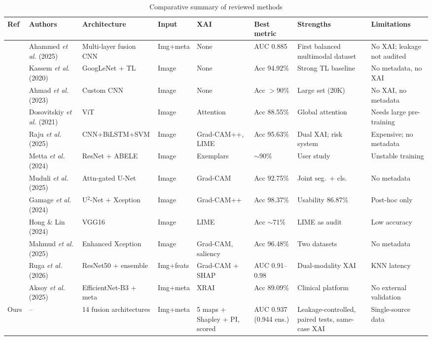 \documentclass[journal]{IEEEtran}
\begin{document}
\begin{table}[!t]
\centering
\caption{Comparative summary of reviewed methods}
\label{tab:lit}
\scriptsize
\begin{tabular}{p{0.4cm}p{1.9cm}p{2.2cm}p{1.1cm}p{1.5cm}p{1.4cm}p{3.1cm}p{2.9cm}}
\toprule
Ref & Authors & Architecture & Input & XAI & Best metric & Strengths & Limitations \\
\midrule
\cite{ahammed2025} & Ahammed \textit{et al.} (2025) & Multi-layer fusion CNN & Img+meta & None & AUC 0.885 & First balanced multimodal dataset & No XAI; leakage not audited \\
\cite{kassem2020} & Kassem \textit{et al.} (2020) & GoogLeNet + TL & Image & None & Acc 94.92\% & Strong TL baseline & No metadata, no XAI \\
\cite{ahmad2023} & Ahmad \textit{et al.} (2023) & Custom CNN & Image & None & Acc $>$90\% & Large set (20K) & No XAI, no metadata \\
\cite{dosovitskiy2021} & Dosovitskiy \textit{et al.} (2021) & ViT & Image & Attention & Acc 88.55\% & Global attention & Needs large pre-training \\
\cite{raju2025} & Raju \textit{et al.} (2025) & CNN+BiLSTM+SVM & Image & Grad-CAM++, LIME & Acc 95.63\% & Dual XAI; risk system & Expensive; no metadata \\
\cite{metta2024} & Metta \textit{et al.} (2024) & ResNet + ABELE & Image & Exemplars & $\sim$90\% & User study & Unstable training \\
\cite{muduli2025} & Muduli \textit{et al.} (2025) & Attn-gated U-Net & Image & Grad-CAM & Acc 92.75\% & Joint seg.\ + cls. & No metadata \\
\cite{gamage2024} & Gamage \textit{et al.} (2024) & U$^2$-Net + Xception & Image & Grad-CAM++ & Acc 98.37\% & Usability 86.87\% & Post-hoc only \\
\cite{hong2024} & Hong \& Lin (2024) & VGG16 & Image & LIME & Acc $\sim$71\% & LIME as audit & Low accuracy \\
\cite{mahmud2025} & Mahmud \textit{et al.} (2025) & Enhanced Xception & Image & Grad-CAM, saliency & Acc 96.48\% & Two datasets & No metadata \\
\cite{ruga2026} & Ruga \textit{et al.} (2026) & ResNet50 + ensemble & Img+feats & Grad-CAM + SHAP & AUC 0.91--0.98 & Dual-modality XAI & KNN latency \\
\cite{aksoy2025} & Aksoy \textit{et al.} (2025) & EfficientNet-B3 + meta & Img+meta & XRAI & Acc 89.09\% & Clinical platform & No external validation \\
\midrule
Ours & -- & 14 fusion architectures & Img+meta & 5 maps + Shapley + PI, scored & AUC 0.937 (0.944 ens.) & Leakage-controlled, paired tests, same-case XAI & Single-source data \\
\bottomrule
\end{tabular}
\end{table}
\end{document}
